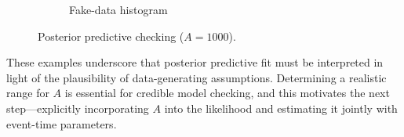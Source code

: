 \begin{figure}[H]
\begin{subfigure}[t]{0.37\textwidth}
  \caption{{\small Fake-data histogram}}
  \label{fig:fake-hist_a1000}
\end{subfigure}
\caption{{\small Posterior predictive checking ($A=1000$).}}
\label{fig:ppc-A1000}
\end{figure}
These examples underscore that posterior predictive fit must be interpreted in light of the plausibility of data-generating assumptions. Determining a realistic range for $A$ is essential for credible model checking, and this motivates the next step—explicitly incorporating $A$ into the likelihood and estimating it jointly with event-time parameters.